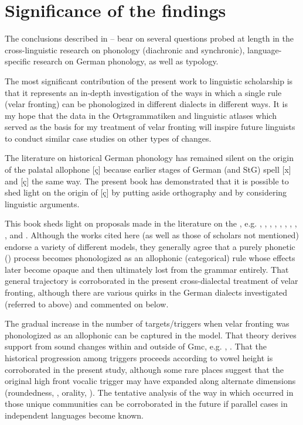 \section{{Significance} {of} {the} {findings}}\label{sec:18.4}

The conclusions described in -- bear on several questions probed at length in the cross-linguistic research on phonology (diachronic and synchronic), language-specific research on German phonology, as well as typology.

The most significant contribution of the present work to linguistic scholarship is that it represents an in-depth investigation of the ways in which a single rule (velar fronting) can be phonologized in different dialects in different ways. It is my hope that the data in the Ortsgrammatiken and linguistic atlases which served as the basis for my treatment of velar fronting will inspire future linguists to conduct similar case studies on other types of changes.

The literature on historical German phonology has remained silent on the origin of the palatal allophone [ç] because earlier stages of German (and StG) spell [x] and [ç] the same way. The present book has demonstrated that it is possible to shed light on the origin of [ç] by putting aside orthography and by considering linguistic arguments.

This book sheds light on proposals made in the literature on the , e.g. \citet{Hyman1976}, \citet{Dressler1976}, \citet{Kiparsky1995}, \citet{Bermúdez-Otero2007}, \citet{Hyman2013}, \citet{Kiparsky2015}, \citet{Bermúdez-Otero2015}, \citet{Ramsammy2015}, \citet{Sen2016}, and \citet{Turton2017}. Although the works cited here (as well as those of scholars not mentioned) endorse a variety of different models, they generally agree that a purely phonetic () process becomes phonologized as an allophonic (categorical) rule whose effects later become opaque and then ultimately lost from the grammar entirely. That general trajectory is corroborated in the present cross-dialectal treatment of velar fronting, although there are various quirks in the German dialects investigated (referred to above) and commented on below.

The gradual increase in the number of targets/triggers when velar fronting was phonologized as an allophonic can be captured in the  model. That theory derives support from sound changes within and outside of Gmc, e.g. \citet{DavisSalmons1999}, \citet{Bermúdez-Otero2015}. That the historical progression among triggers proceeds according to vowel height is corroborated in the present study, although some rare places suggest that the original high front vocalic trigger may have expanded along alternate dimensions (roundedness, , orality, ). The tentative analysis of the way in which  occurred in those unique communities can be corroborated in the future if parallel cases in independent languages become known.

